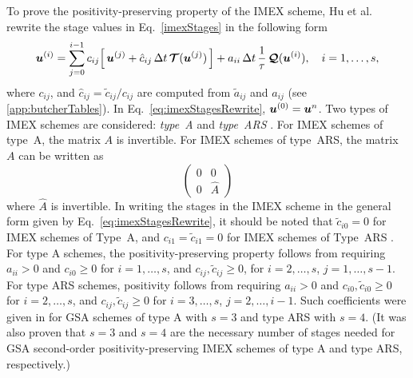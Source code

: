 To prove the positivity-preserving property of the IMEX scheme, Hu et al. \cite{hu_etal_2018} rewrite the stage values in Eq.~\eqref{imexStages} in the following form
\begin{equation}
  \boldsymbol{u}^{(i)}
  =\sum_{j=0}^{i-1}c_{ij}\Big[\,\boldsymbol{u}^{(j)}+\hat{c}_{ij}\,\Delta t\,\boldsymbol{\mathcal{T}}(\boldsymbol{u}^{(j)})\,\Big]
  +a_{ii}\,\Delta t\,\frac{1}{\tau}\,\boldsymbol{\mathcal{Q}}(\boldsymbol{u}^{(i)}),\quad i=1,\ldots,s,
  \label{eq:imexStagesRewrite}
\end{equation}
where $c_{ij}$, and $\hat{c}_{ij}=\tilde{c}_{ij}/c_{ij}$ are computed from $\tilde{a}_{ij}$ and $a_{ij}$ (see \ref{app:butcherTables}).  
In Eq.~\eqref{eq:imexStagesRewrite}, $\boldsymbol{u}^{(0)}=\boldsymbol{u}^{n}$.  
Two types of IMEX schemes are considered: \emph{type~A} \cite{pareschiRusso_2005,dimarcoPareschi2013} and \emph{type~ARS} \cite{ascher_etal_1997}.  
For IMEX schemes of type~A, the matrix $A$ is invertible.  
For IMEX schemes of type~ARS, the matrix $A$ can be written as
\[\left( 
   \begin{matrix} 
       0 & 0 \\ 
       0 & \hat{A}
   \end{matrix}
\right)\]
where $\hat{A}$ is invertible.  
In writing the stages in the IMEX scheme in the general form given by Eq.~\eqref{eq:imexStagesRewrite}, it should be noted that $\tilde{c}_{i0}=0$ for IMEX schemes of Type~A, and $c_{i1}=\tilde{c}_{i1}=0$ for IMEX schemes of Type~ARS \cite{hu_etal_2018}.  
For type A schemes, the positivity-preserving property follows from requiring $a_{ii}>0$ and $c_{i0}\ge0$ for $i=1,\ldots,s$, and $c_{ij},\tilde{c}_{ij}\ge0$, for $i=2,\ldots,s$, $j=1,\ldots,s-1$.  
For type ARS schemes, positivity follows from requiring $a_{ii}>0$ and $c_{i0},\tilde{c}_{i0}\ge0$ for $i=2,\ldots,s$, and $c_{ij},\tilde{c}_{ij}\ge0$ for $i=3,\ldots,s$, $j=2,\ldots,i-1$.  
Such coefficients were given in \cite{hu_etal_2018} for GSA schemes of type A with $s=3$ and type ARS with $s=4$.  
(It was also proven that $s=3$ and $s=4$ are the necessary number of stages needed for GSA second-order positivity-preserving IMEX schemes of type A and type ARS, respectively.)  

